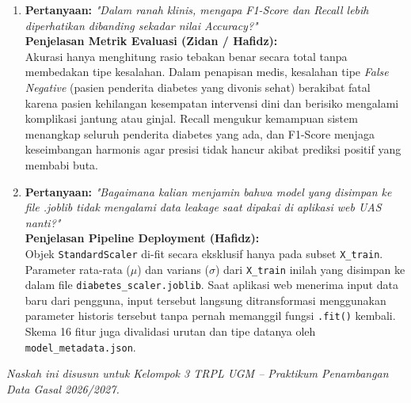\documentclass[11pt,a4paper]{article}
\begin{document}
\begin{enumerate}[leftmargin=*,itemsep=8pt]
    \item \textbf{Pertanyaan:} \textit{"Dalam ranah klinis, mengapa F1-Score dan Recall lebih diperhatikan dibanding sekadar nilai Accuracy?"}\\
    \textbf{Penjelasan Metrik Evaluasi (Zidan / Hafidz):}\\
    Akurasi hanya menghitung rasio tebakan benar secara total tanpa membedakan tipe kesalahan. Dalam penapisan medis, kesalahan tipe \textit{False Negative} (pasien penderita diabetes yang divonis sehat) berakibat fatal karena pasien kehilangan kesempatan intervensi dini dan berisiko mengalami komplikasi jantung atau ginjal. Recall mengukur kemampuan sistem menangkap seluruh penderita diabetes yang ada, dan F1-Score menjaga keseimbangan harmonis agar presisi tidak hancur akibat prediksi positif yang membabi buta.

    \item \textbf{Pertanyaan:} \textit{"Bagaimana kalian menjamin bahwa model yang disimpan ke file .joblib tidak mengalami data leakage saat dipakai di aplikasi web UAS nanti?"}\\
    \textbf{Penjelasan Pipeline Deployment (Hafidz):}\\
    Objek \texttt{StandardScaler} di-fit secara eksklusif hanya pada subset \texttt{X\_train}. Parameter rata-rata ($\mu$) dan varians ($\sigma$) dari \texttt{X\_train} inilah yang disimpan ke dalam file \texttt{diabetes\_scaler.joblib}. Saat aplikasi web menerima input data baru dari pengguna, input tersebut langsung ditransformasi menggunakan parameter historis tersebut tanpa pernah memanggil fungsi \texttt{.fit()} kembali. Skema 16 fitur juga divalidasi urutan dan tipe datanya oleh \texttt{model\_metadata.json}.
\end{enumerate}

\vspace{0.6cm}
\begin{center}
    \small\textit{Naskah ini disusun untuk Kelompok 3 TRPL UGM -- Praktikum Penambangan Data Gasal 2026/2027.}
\end{center}
\end{document}
